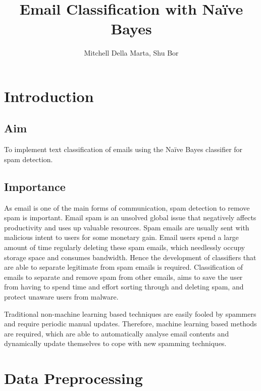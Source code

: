 \documentclass[10pt, a4paper]{article}
\title{Email Classification with Na\"ive Bayes}
\author{Mitchell Della Marta, Shu Bor}
\date{}
\begin{document}
\renewcommand\thetable{\Roman{table}}

\maketitle

\section{Introduction}

\subsection{Aim}

To implement text classification of emails using the Na\"ive Bayes classifier for spam detection.

\subsection{Importance}

As email is one of the main forms of communication, spam detection to remove spam is important. Email spam is an unsolved global issue that negatively affects productivity and uses up valuable resources. Spam emails are usually sent with malicious intent to users for some monetary gain. Email users spend a large amount of time regularly deleting these spam emails, which needlessly occupy storage space and consumes bandwidth. Hence the development of classifiers that are able to separate legitimate from spam emails is required. Classification of emails to separate and remove spam from other emails, aims to save the user from having to spend time and effort sorting through and deleting spam, and protect unaware users from malware.

Traditional non-machine learning based techniques are easily fooled by spammers and require periodic manual updates. Therefore, machine learning based methods are required, which are able to automatically analyse email contents and dynamically update themselves to cope with new spamming techniques.

\section{Data Preprocessing}

\end{document}
